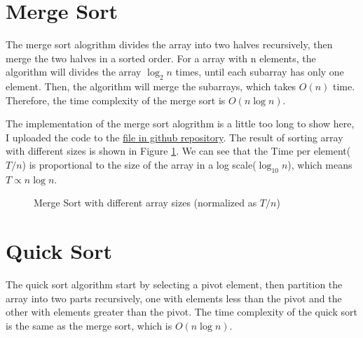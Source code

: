 \documentclass[a4paper,11pt]{article}
\begin{document}
\section*{Merge Sort}

The merge sort alogrithm divides the array into two halves recursively, then merge
the two halves in a sorted order. For a array with n elements, the algorithm will
divides the array $\log_2 n$ times, until each subarray has only one element.
Then, the algorithm will merge the subarrays, which takes $O(n)$ time. Therefore,
the time complexity of the merge sort is $O(n \log n)$.

The implementation of the merge sort alogrithm is a little too long to show here,
I uploaded the code to the \href{https://github.com/zebra314/ID1021-Algorithms-and-Data-Structures/blob/main/assignment\_4/merge\_sort.c}{file in github repository}.
The result of sorting array with different sizes is shown in Figure \ref{fig:merge-sort}.
We can see that the Time per element($T/n$) is proportional to the size of the array in a log scale($\log_{10}n$),
which means $T \propto n \log n$.

\begin{figure}[H]
  \centering
  \caption{Merge Sort with different array sizes (normalized as $T/n$)}
  \label{fig:merge-sort}
\end{figure}
  
\section*{Quick Sort}

The quick sort algorithm start by selecting a pivot element, then partition the array
into two parts recursively, one with elements less than the pivot and the other with elements greater
than the pivot. The time complexity of the quick sort is the same as the merge sort, which is $O(n \log n)$.
\end{document}

